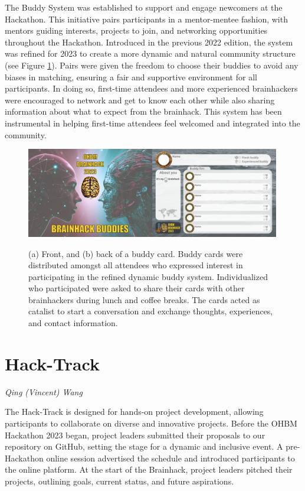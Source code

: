 \documentclass{article}
\newcommand\coordinator[1]{\begin{flushleft}\small\textit{#1}\end{flushleft}}
\begin{document}
The Buddy System was established to support and engage newcomers at the Hackathon.
This initiative pairs participants in a mentor-mentee fashion, with mentors guiding interests, projects to join, and networking opportunities throughout the Hackathon.
Introduced in the previous 2022 edition, the system was refined for 2023 to create a more dynamic and natural community structure (see Figure \ref{fig:buddy-system}).
Pairs were given the freedom to choose their buddies to avoid any biases in matching, ensuring a fair and supportive environment for all participants.
In doing so, first-time attendees and more experienced brainhackers were encouraged to network and get to know each other while also sharing information about what to expect from the brainhack.
This system has been instrumental in helping first-time attendees feel welcomed and integrated into the community.

\begin{figure}[h]
    \centering
    \includegraphics[width=0.99\textwidth]{images/buddy-system.png}
    \label{fig:buddy-system}
    \caption{
        (a) Front, and (b) back of a buddy card.
        Buddy cards were distributed amongst all attendees who expressed interest in participating in the refined dynamic buddy system.
        Individualized who participated were asked to share their cards with other brainhackers during lunch and coffee breaks.
        The cards acted as catalist to start a conversation and exchange thoughts, experiences, and contact information.
    }
\end{figure}

\section{Hack-Track}
\coordinator{Qing (Vincent) Wang}

The Hack-Track is designed for hands-on project development, allowing participants to collaborate on diverse and innovative projects.
Before the OHBM Hackathon 2023 began, project leaders submitted their proposals to our repository on GitHub, setting the stage for a dynamic and inclusive event.
A pre-Hackathon online session advertised the schedule and introduced participants to the online platform.
At the start of the Brainhack, project leaders pitched their projects, outlining goals, current status, and future aspirations.
\end{document}

